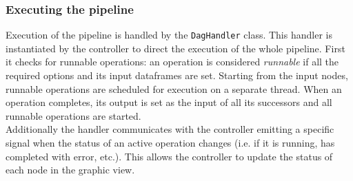 \subsubsection{Executing the pipeline}\label{sssec:pipeline-execute}
Execution of the pipeline is handled by the \texttt{DagHandler} class. This handler is instantiated by the controller to direct the execution of the whole pipeline. First it checks for runnable operations: an operation is considered \textit{runnable} if all the required options and its input dataframes are set. Starting from the input nodes, runnable operations are scheduled for execution on a separate thread. When an operation completes, its output is set as the input of all its successors and all runnable operations are started.\\
Additionally the handler communicates with the controller emitting a specific signal when the status of an active operation changes (i.e. if it is running, has completed with error, etc.). This allows the controller to update the status of each node in the graphic view.

